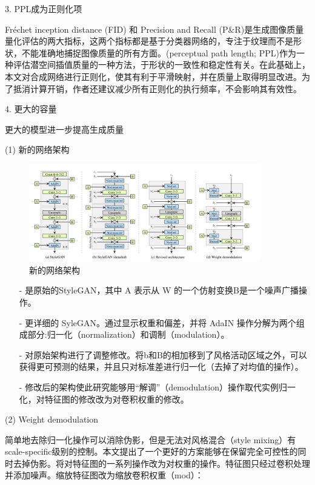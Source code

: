 3. PPL成为正则化项

Fréchet inception distance (FID) 和 Precision and Recall (P\&R)是生成图像质量量化评估的两大指标，这两个指标都是基于分类器网络的，专注于纹理而不是形状，不能准确地捕捉图像质量的所有方面。(perceptual path length; PPL)作为一种评估潜空间插值质量的一种方法，于形状的一致性和稳定性有关。在此基础上，本文对合成网络进行正则化，使其有利于平滑映射，并在质量上取得明显改进。为了抵消计算开销，作者还建议减少所有正则化的执行频率，不会影响其有效性。

4. 更大的容量

更大的模型进一步提高生成质量

(1) 新的网络架构

\begin{figure}[htb]
\centering 
\includegraphics[width=0.9\textwidth]{img/m2t13.png} 
\caption{新的网络架构}
\label{Test}
\end{figure}

\begin{enumerate}
\item [-] 是原始的StyleGAN，其中 A 表示从 W 的一个仿射变换B是一个噪声广播操作。
\item [-] 更详细的 SyleGAN。通过显示权重和偏差，并将 AdaIN 操作分解为两个组成部分:归一化（normalization）和调制（modulation）。
\item [-] 对原始架构进行了调整修改。将b和B的相加移到了风格活动区域之外，可以获得更可预测的结果，并且只对标准差进行归一化（去掉了对均值的操作）。
\item [-] 修改后的架构使此研究能够用“解调”（demodulation）操作取代实例归一化，对特征图的修改改为对卷积权重的修改。
\end{enumerate}

(2) Weight demodulation

简单地去除归一化操作可以消除伪影，但是无法对风格混合（style mixing）有scale-specific级别的控制。本文提出了一个更好的方案能够在保留完全可控性的同时去掉伪影。将对特征图的一系列操作改为对权重的操作。特征图只经过卷积处理并添加噪声。缩放特征图改为缩放卷积权重（mod）：


